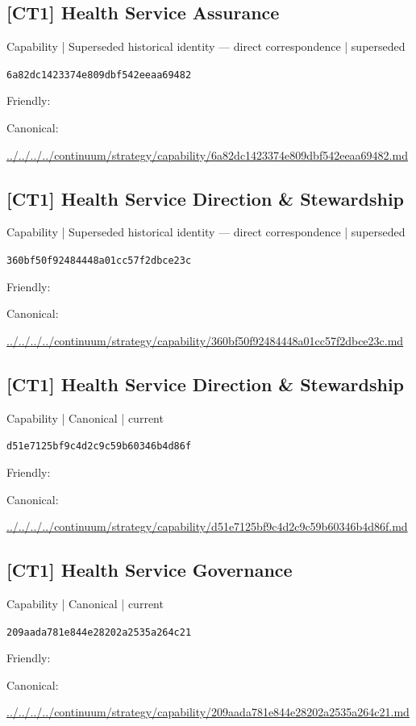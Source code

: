 \documentclass[10pt,a4paper]{article}
\begin{document}
\subsection*{[CT1] Health Service Assurance}
{\small Capability | Superseded historical identity — direct correspondence | superseded}\par
\texttt{6a82dc1423374e809dbf542eeaa69482}\par
Friendly: \par
Canonical: \par
{\footnotesize\url{../../../../continuum/strategy/capability/6a82dc1423374e809dbf542eeaa69482.md}}\par
\subsection*{[CT1] Health Service Direction \& Stewardship}
{\small Capability | Superseded historical identity — direct correspondence | superseded}\par
\texttt{360bf50f92484448a01cc57f2dbce23c}\par
Friendly: \par
Canonical: \par
{\footnotesize\url{../../../../continuum/strategy/capability/360bf50f92484448a01cc57f2dbce23c.md}}\par
\subsection*{[CT1] Health Service Direction \& Stewardship}
{\small Capability | Canonical | current}\par
\texttt{d51e7125bf9c4d2c9c59b60346b4d86f}\par
Friendly: \par
Canonical: \par
{\footnotesize\url{../../../../continuum/strategy/capability/d51e7125bf9c4d2c9c59b60346b4d86f.md}}\par
\subsection*{[CT1] Health Service Governance}
{\small Capability | Canonical | current}\par
\texttt{209aada781e844e28202a2535a264c21}\par
Friendly: \par
Canonical: \par
{\footnotesize\url{../../../../continuum/strategy/capability/209aada781e844e28202a2535a264c21.md}}\par
\end{document}

